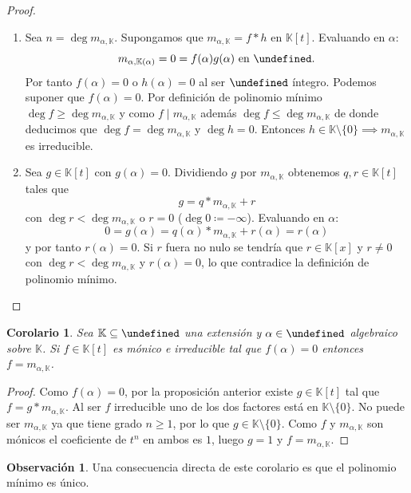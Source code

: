 \documentclass[10pt, spanish]{report}
\newtheorem*{cor}{Corolario}
\theoremstyle{definition}
\newtheorem*{obs}{Observación}
\newcommand{\K}{\mathbb{K}}
\let\L\undefined
\newcommand{\L}{\mathbb{L}}
\renewcommand{\geq}{\geqslant}
\renewcommand{\leq}{\leqslant}
\begin{document}
\begin{proof}\hspace{0pt}
    \begin{enumerate}
        \item Sea $n=\deg{m_{\alpha,\K}}$. Supongamos que $m_{\alpha,\K}=f*h$ en
            $\K[t]$. Evaluando en $\alpha$:
            \[m_{\alpha,\K(\alpha)}=0=f(\alpha)g(\alpha)\text{ en }\L.\]
            Por tanto $f(\alpha)=0$ o $h(\alpha)=0$ al ser $\L$
            íntegro. Podemos suponer que $f(\alpha)=0$. Por definición de
            polinomio mínimo $\deg{f}\geq\deg{m_{\alpha,\K}}$ y como
            $f\mid m_{\alpha,\K}$ además $\deg{f}\leq \deg{m_{\alpha,\K}}$ de
            donde deducimos que $\deg{f}=\deg{m_{\alpha,\K}}$ y $\deg{h}=0$.
            Entonces $h\in\K\setminus\{0\}\implies m_{\alpha,\K}$ es
            irreducible.
        \item Sea $g\in\K[t]$ con $g(\alpha)=0$. Dividiendo $g$ por
            $m_{\alpha,\K}$ obtenemos $q,r\in\K[t]$ tales que \[g=q*m_{\alpha,
            \K}+r\] con $\deg{r}<\deg{m_{\alpha,\K}}$ o $r=0$
            ($\deg{0}\coloneqq-\infty$). Evaluando en $\alpha$:
            \[0=g(\alpha)=q(\alpha)*m_{\alpha,\K}+r(\alpha)=r(\alpha)\]
            y por tanto $r(\alpha)=0$. Si $r$ fuera no nulo se tendría que
            $r\in\K[x]$ y $r\neq 0$ con $\deg{r}<\deg{m_{\alpha,\K}}$ y
            $r(\alpha) = 0$, lo que contradice la definición de polinomio
            mínimo.
    \end{enumerate}
    \vspace{-1em}
\end{proof}


\begin{cor}
    Sea $\K\subseteq\L$ una extensión y $\alpha\in\L$ algebraico sobre $\K$. Si
    $f\in\K[t]$ es mónico e irreducible tal que $f(\alpha)=0$ entonces
    $f=m_{\alpha,\K}$.
\end{cor}

\begin{proof}
    Como $f(\alpha)=0$, por la proposición anterior existe $g\in\K[t]$ tal que
    $f=g*m_{\alpha,\K}$. Al ser $f$ irreducible uno de los dos factores está en
    $\K\setminus\{0\}$. No puede ser $m_{\alpha,\K}$ ya que tiene grado
    $n\geq1$, por lo que $g\in\K\setminus\{0\}$. Como $f$ y $m_{\alpha,\K}$ son
    mónicos el coeficiente de $t^n$ en ambos es $1$, luego $g=1$ y
    $f=m_{\alpha,\K}$.
\end{proof}

\begin{obs}
    Una consecuencia directa de este corolario es que el polinomio mínimo es
    único.
\end{obs}
\end{document}
